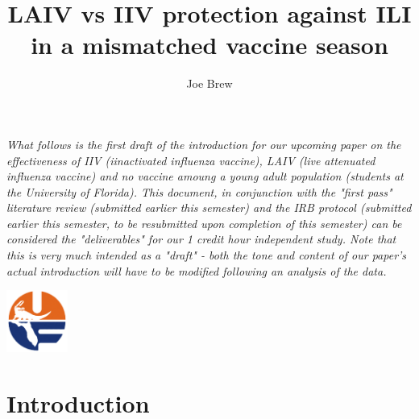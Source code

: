 \documentclass[11pt]{article}
\begin{document}


\title{\textbf{LAIV vs IIV protection against ILI in a mismatched vaccine season }}
\author{Joe Brew}


\maketitle

\emph{What follows is the first draft of the introduction for our upcoming paper on the effectiveness of IIV (iinactivated influenza vaccine), LAIV (live attenuated influenza vaccine) and no vaccine amoung a young adult population (students at the University of Florida).  This document, in conjunction with the "first pass" literature review (submitted earlier this semester) and the IRB protocol (submitted earlier this semester, to be resubmitted upon completion of this semester) can be considered the "deliverables" for our 1 credit hour independent study. Note that this is very much intended as a "draft" - both the tone and content of our paper's actual introduction will have to be modified following an analysis of the data.}
\tableofcontents

\vspace{20mm}

\begin{center}
\includegraphics[width=2cm]{uf}
\end{center}




\section*{Introduction}
\hrulefill
\end{document}
